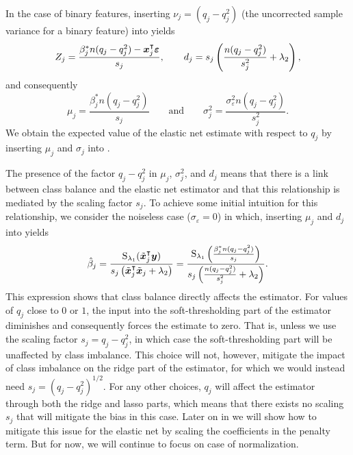 In the case of binary features, inserting \(\nu_j = (q_j - q_j^2)\) (the uncorrected sample
variance for a binary feature) into  yields
\[
  {Z_j} = \frac{\beta_j^* n(q_j - q_j^2) - \boldsymbol{x}_j^\intercal \boldsymbol{\varepsilon}}{s_j}
  ,\qquad
  d_j = s_j\left(\frac{n(q_j - q_j^2)}{s_j^2} + \lambda_2\right),
\]
and consequently
\[
  \mu_j = \frac{\beta^*_j n(q_j - q_j^2)}{s_j}\qquad \text{and} \qquad \sigma_j^2 = \frac{\sigma_\varepsilon^2n(q_j- q_j^2)}{s^2_j}.
\]
%
We obtain the expected value of the elastic net estimate with respect to \(q_j\) by
inserting \(\mu_j\) and \(\sigma_j\) into .

The presence of the factor \(q_j - q_j^2\) in \(\mu_j\), \(\sigma_j^2\), and \(d_j\) means
that there is a link between class balance and the elastic net estimator and that this
relationship is mediated by the scaling factor \(s_j\). To achieve some initial intuition
for this relationship, we consider the noiseless case (\(\sigma_\varepsilon = 0\)) in
which, inserting \(\mu_j\) and \(d_j\) into  yields
\begin{equation}
  \label{eq:noiseless-estimator}
  \hat{\beta}_j = \frac{\operatorname{S}_{\lambda_1}(\tilde{\boldsymbol{x}}_j^\intercal \boldsymbol{y})}{s_j\left(\tilde{\boldsymbol{x}}_j^\intercal \tilde{\boldsymbol{x}}_j + \lambda_2\right)}
  =
  \frac{\operatorname{S}_{\lambda_1}\left(\frac{\beta_j^* n (q_j - q_j^2)}{s_j}\right)}{s_j\left(\frac{n(q_j - q_j^2)}{s_j^2} + \lambda_2\right)}.
\end{equation}
%
This expression shows that class balance directly affects the estimator. For values of
\(q_j\) close to \(0\) or \(1\), the input into the soft-thresholding part of the estimator
diminishes and consequently forces the estimate to zero. That is, unless we use the scaling
factor \(s_j = q_j - q_j^2\), in which case the soft-thresholding part will be unaffected
by class imbalance. This choice will not, however, mitigate the impact of class imbalance
on the ridge part of the estimator, for which we would instead need \(s_j = (q_j -
q_j^2)^{1/2}\). For any other choices, \(q_j\) will affect the estimator through both the
ridge and lasso parts, which means that there exists no scaling \(s_j\) that will mitigate
the bias in this case. Later on in  we will show how to mitigate
this issue for the elastic net by scaling the coefficients in the penalty term. But for
now, we will continue to focus on case of normalization.

